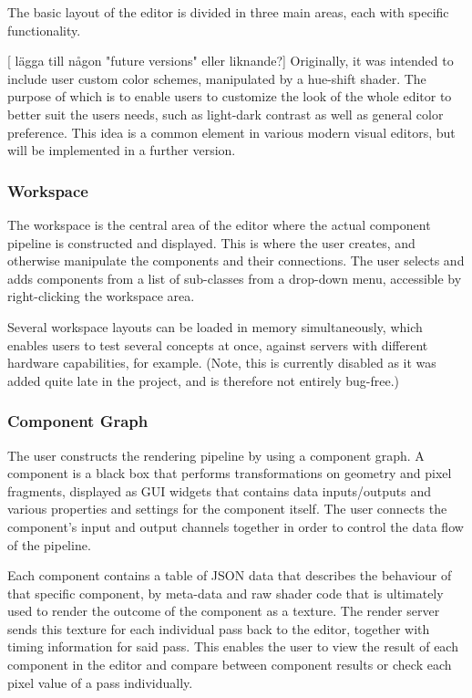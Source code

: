 The basic layout of the editor is divided in three main areas, each with specific functionality.  

[ lägga till någon "future versions" eller liknande?]
Originally, it was intended to include user custom color schemes, manipulated by a hue-shift shader. The purpose of which is to enable users to customize the look of the whole editor to better suit the users needs, such as light-dark contrast as well as general color preference. This idea is a common element in various modern visual editors, but will be implemented in a further version. 

\subsubsection{Workspace}
The workspace is the central area of the editor where the actual component pipeline is constructed and displayed. This is where the user creates, and otherwise manipulate the components and their connections. The user selects and adds components from a list of sub-classes from a drop-down menu, accessible by right-clicking the workspace area. 

Several workspace layouts can be loaded in memory simultaneously, which enables users to test several concepts at once, against servers with different hardware capabilities, for example. (Note, this is currently disabled as it was added quite late in the project, and is therefore not entirely bug-free.)

\subsubsection{Component Graph}
The user constructs the rendering pipeline by using a component graph. A component is a black box that performs transformations on geometry and pixel fragments, displayed as GUI widgets that contains data inputs/outputs and various properties and settings for the component itself. The user connects the component’s input and output channels together in order to control the data flow of the pipeline. 

Each component contains a table of JSON data that describes the behaviour of that specific component, by meta-data and raw shader code that is ultimately used to render the outcome of the component as a texture. The render server sends this texture for each individual pass back to the editor, together with timing information for said pass. This enables the user to view the result of each component in the editor and compare between component results or check each pixel value of a pass individually. 

